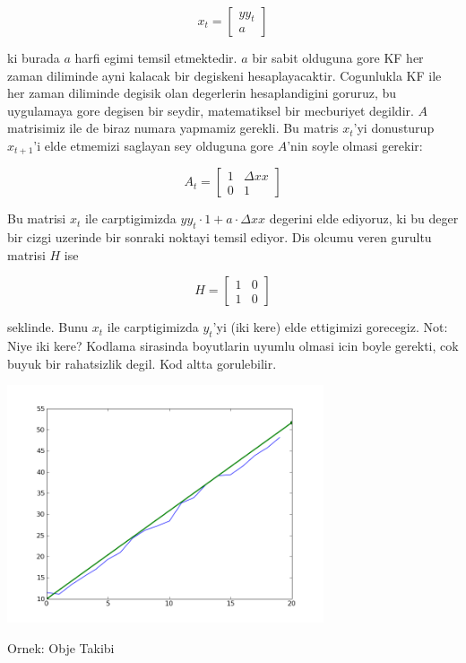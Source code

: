 \documentclass[12pt,fleqn]{article}
\begin{document}
\[ x_t = 
\left[\begin{array}{r}
yy_t \\
a
\end{array}\right]
 \]

ki burada $a$ harfi egimi temsil etmektedir. $a$ bir sabit olduguna gore
KF her zaman diliminde ayni kalacak bir degiskeni
hesaplayacaktir. Cogunlukla KF ile her zaman diliminde degisik olan
degerlerin hesaplandigini goruruz, bu uygulamaya gore degisen bir seydir,
matematiksel bir mecburiyet degildir. $A$ matrisimiz ile de biraz numara
yapmamiz gerekli. Bu matris $x_t$'yi donusturup $x_{t+1}$'i elde etmemizi
saglayan sey olduguna gore $A$'nin soyle olmasi gerekir:

\[ 
A_t = 
\left[\begin{array}{rr}
1 & \Delta xx \\
0 & 1
\end{array}\right]
 \]

Bu matrisi $x_t$ ile carptigimizda $yy_t \cdot 1 + a \cdot \Delta xx$
degerini elde ediyoruz, ki bu deger bir cizgi uzerinde bir sonraki noktayi
temsil ediyor. Dis olcumu veren gurultu matrisi $H$ ise

\[ H =
\left[\begin{array}{rr}
1 & 0 \\
1 & 0
\end{array}\right]
 \]

seklinde. Bunu $x_t$ ile carptigimizda $y_t$'yi (iki kere) elde ettigimizi
gorecegiz.  Not: Niye iki kere? Kodlama sirasinda boyutlarin uyumlu olmasi
icin boyle gerekti, cok buyuk bir rahatsizlik degil. Kod altta
gorulebilir.



\includegraphics[height=7cm]{kalman-line-fit.png}

Ornek: Obje Takibi
\end{document}
